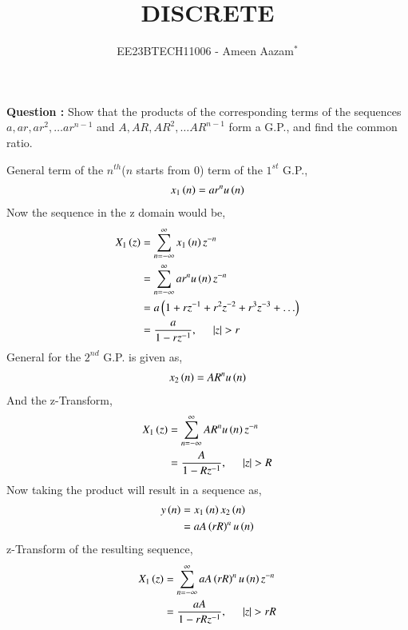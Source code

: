 \documentclass[journal,12pt,twocolumn]{IEEEtran}
\theoremstyle{remark}
\begin{document}

\vspace{3cm}

\title{DISCRETE}
\author{EE23BTECH11006 - Ameen Aazam$^{*}$%
}
\maketitle
\newpage
\bigskip

\renewcommand{\thefigure}{\theenumi}
\renewcommand{\thetable}{\theenumi}

\vspace{3cm}
\textbf{Question :}
Show that the products of the corresponding terms of the sequences $a, ar, ar^2, \ldots ar^{n-1}$ and $A, AR, AR^2, \ldots AR^{n-1}$ form a G.P., and find the common ratio.

\solution

General term of the $n^{th}$($n$ starts from $0$) term of the $1^{st}$ G.P.,
\begin{align}
    x_1\left(n\right)=ar^nu\left(n\right)
\end{align}
Now the sequence in the z domain would be,
\begin{align}
    X_1\brak{z}&=\sum\limits_{n=-\infty}^{\infty}x_1\brak{n}z^{-n} \\
    &=\sum\limits_{n=-\infty}^{\infty}ar^nu\brak{n}z^{-n} \\
    &=a\brak{1+rz^{-1}+r^2z^{-2}+r^3z^{-3}+\ldots} \\
    &=\frac{a}{1-rz^{-1}},\hspace{0.5cm}|z|>r
\end{align}
General for the $2^{nd}$ G.P. is given as,
\begin{align}
    x_2\left(n\right)=AR^nu\left(n\right)
\end{align}
And the z-Transform,
\begin{align}
    X_1\brak{z}&=\sum\limits_{n=-\infty}^{\infty}AR^nu\brak{n}z^{-n} \\
    &=\frac{A}{1-Rz^{-1}},\hspace{0.5cm}|z|>R
\end{align}
Now taking the product will result in a sequence as,
\begin{align}
    y\left(n\right)&=x_1\left(n\right)x_2\left(n\right) \\
    &=aA\left(rR\right)^nu\left(n\right) \label{eq:11.9.3.20.1}
\end{align}
z-Transform of the resulting sequence,
\begin{align}
    X_1\brak{z}&=\sum\limits_{n=-\infty}^{\infty}aA\brak{rR}^nu\brak{n}z^{-n} \\
    &=\frac{aA}{1-rRz^{-1}},\hspace{0.5cm}|z|>rR
\end{align}
\end{document}
